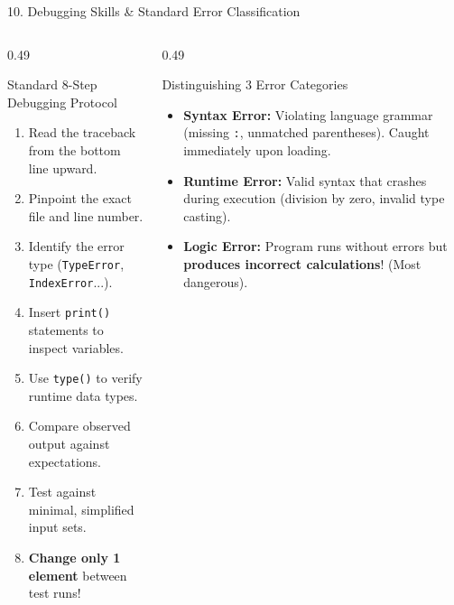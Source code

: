 \documentclass[aspectratio=169, 10pt]{beamer}
\begin{document}
\begin{frame}{10. Debugging Skills \& Standard Error Classification}
  \begin{columns}[T]
    \begin{column}{0.49\textwidth}
      \begin{cbox}[primaryblue]{Standard 8-Step Debugging Protocol}
        \scriptsize
        \begin{enumerate}\setlength{\itemsep}{1.5pt}
          \item Read the traceback from the bottom line upward.
          \item Pinpoint the exact file and line number.
          \item Identify the error type (\texttt{TypeError}, \texttt{IndexError}...).
          \item Insert \texttt{print()} statements to inspect variables.
          \item Use \texttt{type()} to verify runtime data types.
          \item Compare observed output against expectations.
          \item Test against minimal, simplified input sets.
          \item \textbf{Change only 1 element} between test runs!
        \end{enumerate}
      \end{cbox}
    \end{column}
    \begin{column}{0.49\textwidth}
      \begin{cbox}[accentorange]{Distinguishing 3 Error Categories}
        \footnotesize
        \begin{itemize}\setlength{\itemsep}{3pt}
          \item \textbf{Syntax Error:} Violating language grammar (missing \texttt{:}, unmatched parentheses). Caught immediately upon loading.
          \item \textbf{Runtime Error:} Valid syntax that crashes during execution (division by zero, invalid type casting).
          \item \textbf{Logic Error:} Program runs without errors but \textbf{produces incorrect calculations}! (Most dangerous).
        \end{itemize}
      \end{cbox}
    \end{column}
  \end{columns}
\end{frame}
\end{document}

